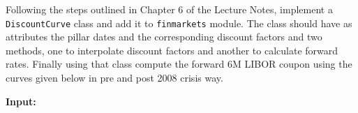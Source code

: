 \begin{Exercise}[title={(Discount Curves)}]
  Following the steps outlined in Chapter 6 of the Lecture Notes, implement a \texttt{DiscountCurve} class and add it to \texttt{finmarkets} module. The class should have as attributes the pillar dates and the corresponding discount factors and two methods, one to interpolate discount factors and another to calculate forward rates.
  Finally using that class compute the forward 6M LIBOR coupon using the curves given below in pre and post 2008 crisis way.

\textbf{Input:}
\begin{Shaded}
\begin{Highlighting}[]
\OperatorTok{=}\NormalTok{, }\NormalTok{, }\NormalTok{)}
\OperatorTok{=}\NormalTok{,}\NormalTok{, }\NormalTok{)}
\OperatorTok{=}\NormalTok{, }\NormalTok{, }\NormalTok{)}

\OperatorTok{=}\NormalTok{ [date(}\NormalTok{ , }\NormalTok{ ,}\NormalTok{), }
\NormalTok{, }\NormalTok{, }\NormalTok{), }
\NormalTok{, }\NormalTok{ ,}\NormalTok{)]}
\OperatorTok{=}\NormalTok{ [}\NormalTok{, }\NormalTok{, }\NormalTok{]}

\OperatorTok{=}\NormalTok{ [date(}\NormalTok{, }\NormalTok{ ,}\NormalTok{), }
\NormalTok{, }\NormalTok{, }\NormalTok{), }
\NormalTok{, }\NormalTok{ ,}\NormalTok{)]}
\OperatorTok{=}\NormalTok{ [}\NormalTok{, }\NormalTok{, }\NormalTok{]}
\end{Highlighting}
\end{Shaded}
\end{Exercise}

